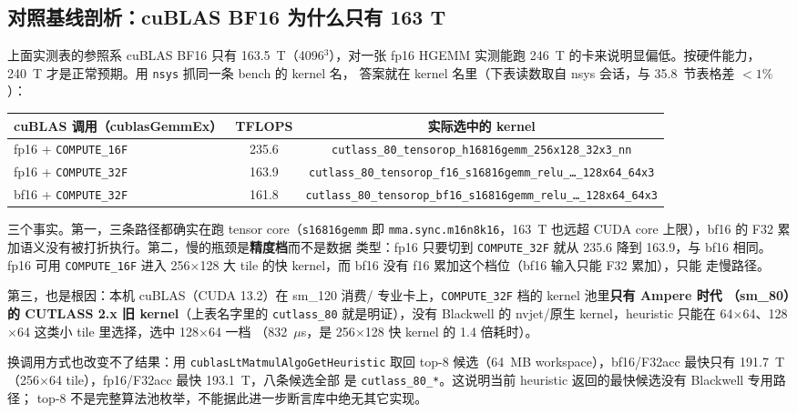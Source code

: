 \subsection{对照基线剖析：cuBLAS BF16 为什么只有 163 T}\label{sec:35-cublas}

上面实测表的参照系 cuBLAS BF16 只有 163.5~T（4096$^3$），对一张
fp16 HGEMM 实测能跑 246~T 的卡来说明显偏低。按硬件能力，
240~T 才是正常预期。用 \texttt{nsys} 抓同一条 bench 的 kernel 名，
答案就在 kernel 名里（下表读数取自 nsys 会话，与 35.8~节表格差 $<1\%$）：

\begin{center}
\footnotesize
\begin{tabular}{lcc}
\toprule
cuBLAS 调用（cublasGemmEx） & TFLOPS & 实际选中的 kernel \\
\midrule
fp16 + \texttt{COMPUTE\_16F} & 235.6 & \texttt{cutlass\_80\_tensorop\_h16816gemm\_256x128\_32x3\_nn} \\
fp16 + \texttt{COMPUTE\_32F} & 163.9 & \texttt{cutlass\_80\_tensorop\_f16\_s16816gemm\_relu\_\ldots\_128x64\_64x3} \\
bf16 + \texttt{COMPUTE\_32F} & 161.8 & \texttt{cutlass\_80\_tensorop\_bf16\_s16816gemm\_relu\_\ldots\_128x64\_64x3} \\
\bottomrule
\end{tabular}
\end{center}

三个事实。第一，三条路径都确实在跑 tensor core（\texttt{s16816gemm}
即 \texttt{mma.sync.m16n8k16}，163~T 也远超 CUDA core 上限），bf16 的
F32 累加语义没有被打折执行。第二，慢的瓶颈是\textbf{精度档}而不是数据
类型：fp16 只要切到 \texttt{COMPUTE\_32F} 就从 235.6 降到 163.9，与 bf16
相同。fp16 可用 \texttt{COMPUTE\_16F} 进入 256$\times$128 大 tile 的快
kernel，而 bf16 没有 f16 累加这个档位（bf16 输入只能 F32 累加），只能
走慢路径。

第三，也是根因：本机 cuBLAS（CUDA 13.2）在 sm\_120 消费/
专业卡上，\texttt{COMPUTE\_32F} 档的 kernel 池里\textbf{只有 Ampere 时代
（sm\_80）的 CUTLASS 2.x 旧 kernel}（上表名字里的 \texttt{cutlass\_80}
就是明证），没有 Blackwell 的 nvjet/原生 kernel，heuristic 只能在
64$\times$64、128$\times$64 这类小 tile 里选择，选中 128$\times$64 一档
（832~$\mu$s，是 256$\times$128 快 kernel 的 1.4 倍耗时）。

换调用方式也改变不了结果：用 \texttt{cublasLtMatmulAlgoGetHeuristic} 取回
top-8 候选（64~MB workspace），bf16/F32acc 最快只有 191.7~T
（256$\times$64 tile），fp16/F32acc 最快 193.1~T，八条候选全部
是 \texttt{cutlass\_80\_*}。这说明当前 heuristic 返回的最快候选没有 Blackwell 专用路径；
top-8 不是完整算法池枚举，不能据此进一步断言库中绝无其它实现。

